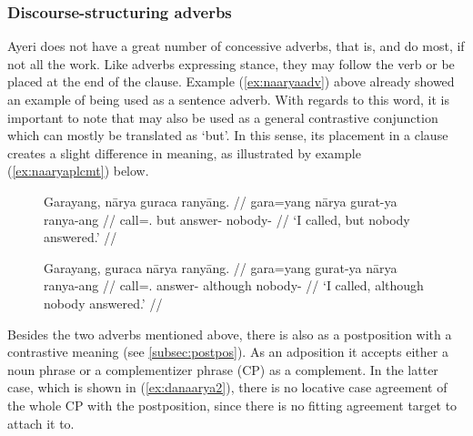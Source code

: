 \subsubsection{Discourse-structuring adverbs}
\label{subsubsec:discourseadv}

Ayeri does not have a great number of concessive adverbs, that is,
 and  do most, if not all the work. Like adverbs expressing stance,
they may follow the verb or be placed at the end of the clause. Example
(\ref{ex:naaryaadv}) above already showed an example of 
being used as a sentence adverb. With regards to this word, it is important to
note that  may also be used as a general contrastive
conjunction which can mostly be translated as `but'. In this sense, its
placement in a clause creates a slight difference in meaning, as illustrated
by example (\ref{ex:naaryaplcmt}) below.

\begin{figure}[h]
\pex\label{ex:naaryaplcmt}
\a\label{ex:naaryaconj}\begingl
	\gla Garayang, nārya guraca ranyāng. //
	\glb gara=yang nārya gurat-ya ranya-ang //
	\glc call=\Fsg{}.\Aarg{} but answer-\TsgM{} nobody-\Aarg{} //
	\glft `I called, but nobody answered.' //
\endgl

\a\label{ex:naaryaadv2}\begingl
	\gla Garayang, guraca nārya ranyāng. //
	\glb gara=yang gurat-ya nārya ranya-ang //
	\glc call=\Fsg{}.\Aarg{} answer-\TsgM{} although nobody-\Aarg{} //
	\glft `I called, although nobody answered.' //
\endgl
\xe
\end{figure}

Besides the two adverbs mentioned above, there is also
 as a postposition
with a contrastive meaning (see \autoref{subsec:postpos}). As an adposition it
accepts either a noun phrase or a complementizer phrase (CP) as a complement.
In the latter case, which is shown in (\ref{ex:danaarya2}), there is no
locative case agreement of the whole CP with the postposition, since there is
no fitting agreement target to attach it to.

